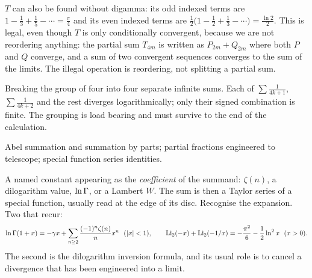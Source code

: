\begin{keynote}
$T$ can also be found without digamma: its odd indexed terms are $1-\tfrac13+\tfrac15-\cdots=\tfrac{\pi}{4}$ and its even indexed terms are $\tfrac12\bigl(1-\tfrac12+\tfrac13-\cdots\bigr)=\tfrac{\ln2}{2}$. This is legal, even though $T$ is only conditionally convergent, because we are not reordering anything: the partial sum $T_{4m}$ is written as $P_{2m}+Q_{2m}$ where both $P$ and $Q$ converge, and a sum of two convergent sequences converges to the sum of the limits. The illegal operation is reordering, not splitting a partial sum.
\end{keynote}

\begin{trap}
Breaking the group of four into four separate infinite sums. Each of $\sum\tfrac{1}{4k+1}$, $\sum\tfrac{1}{4k+2}$ and the rest diverges logarithmically; only their signed combination is finite. The grouping is load bearing and must survive to the end of the calculation.
\end{trap}

\begin{seealsob}Abel summation and summation by parts; partial fractions engineered to telescope; special function series identities.\end{seealsob}

\cue A named constant appearing as the \emph{coefficient} of the summand: $\zeta(n)$, a dilogarithm value, $\ln\Gamma$, or a Lambert $W$. The sum is then a Taylor series of a special function, usually read at the edge of its disc.
\method Recognise the expansion. Two that recur:
\[\ln\Gfun(1+x)=-\gamma x+\sum_{n\geq2}\frac{(-1)^{n}\zeta(n)}{n}x^{n}\ \ (\abs{x}<1),\qquad \Li_2(-x)+\Li_2(-1/x)=-\frac{\pi^{2}}{6}-\frac12\ln^{2}x\ \ (x>0).\]
The second is the dilogarithm inversion formula, and its usual role is to cancel a divergence that has been engineered into a limit.

